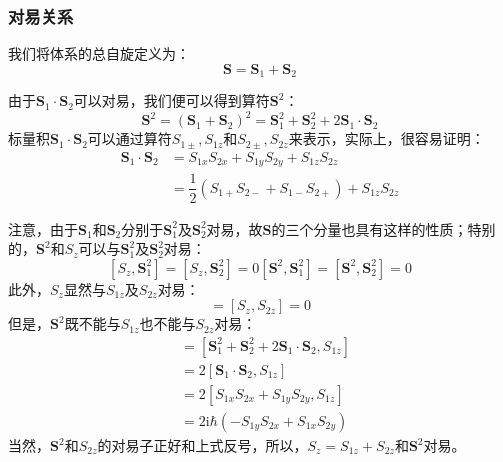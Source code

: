 \documentclass[]{article}
\begin{document}
\subsubsection{对易关系}
我们将体系的总自旋定义为：
\begin{equation}
	\boldsymbol{S}=\boldsymbol{S}_1+\boldsymbol{S}_2
\end{equation}

由于$\boldsymbol{S}_1\cdot\boldsymbol{S}_2$可以对易，我们便可以得到算符$\boldsymbol{S}^2$：
\begin{equation}
	\boldsymbol{S}^2=(\boldsymbol{S}_1+\boldsymbol{S}_2)^2=\boldsymbol{S}_1^2+\boldsymbol{S}_2^2+2\boldsymbol{S}_1\cdot\boldsymbol{S}_2
\end{equation}
标量积$\boldsymbol{S}_1\cdot\boldsymbol{S}_2$可以通过算符$S_{1\pm},S_{1z}$和$S_{2\pm},S_{2z}$来表示，实际上，很容易证明：
\begin{align}
	\boldsymbol{S}_1\cdot\boldsymbol{S}_2&=S_{1x}S_{2x}+S_{1y}S_{2y}+S_{1z}S_{2z}\nonumber\\
	&=\dfrac{1}{2}(S_{1+}S_{2-}+S_{1-}S_{2+})+S_{1z}S_{2z}
\end{align}

注意，由于$\boldsymbol{S}_1$和$\boldsymbol{S}_2$分别于$\boldsymbol{S}_1^2$及$\boldsymbol{S}_2^2$对易，故$\boldsymbol{S}$的三个分量也具有这样的性质；特别的，$\boldsymbol{S}^2$和$S_z$可以与$\boldsymbol{S}_1^2$及$\boldsymbol{S}_2^2$对易：
\begin{subequations}
	\begin{equation}
		[S_z,\boldsymbol{S}_1^2]=[S_z,\boldsymbol{S}_2^2]=0
	\end{equation}
	\begin{equation}
		[\boldsymbol{S}^2,\boldsymbol{S}_1^2]=[\boldsymbol{S}^2,\boldsymbol{S}_2^2]=0
	\end{equation}
\end{subequations}
此外，$S_z$显然与$S_{1z}$及$S_{2z}$对易：
\begin{equation}
	[S_z,S_{1z}]=[S_z,S_{2z}]=0
\end{equation}
但是，$\boldsymbol{S}^2$既不能与$S_{1z}$也不能与$S_{2z}$对易：
\begin{align}
	[\boldsymbol{S}^2,S_{1z}]&=[\boldsymbol{S}_1^2+\boldsymbol{S}_2^2+2\boldsymbol{S}_1\cdot\boldsymbol{S}_2,S_{1z}]\nonumber\\
	&=2[\boldsymbol{S}_1\cdot\boldsymbol{S}_2,S_{1z}]\nonumber\\
	&=2[S_{1x}S_{2x}+S_{1y}S_{2y},S_{1z}]\nonumber\\
	&=2\mathrm{i}\hbar(-S_{1y}S_{2x}+S_{1x}S_{2y})
\end{align}
当然，$\boldsymbol{S}^2$和$S_{2z}$的对易子正好和上式反号，所以，$S_z=S_{1z}+S_{2z}$和$\boldsymbol{S}^2$对易。
\end{document}
